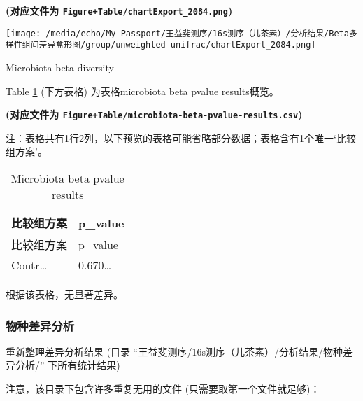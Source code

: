 \documentclass[
]{article}
\begin{document}
\textbf{(对应文件为 \texttt{Figure+Table/chartExport\_2084.png})}

\def\@captype{figure}
\begin{center}
\texttt{[image: /media/echo/My Passport/王益斐测序/16s测序（儿茶素）/分析结果/Beta多样性组间差异盒形图/group/unweighted-unifrac/chartExport\_2084.png]}
\caption{Microbiota beta diversity}\label{fig:microbiota-beta-diversity}
\end{center}

Table \ref{tab:microbiota-beta-pvalue-results} (下方表格) 为表格microbiota beta pvalue results概览。

\textbf{(对应文件为 \texttt{Figure+Table/microbiota-beta-pvalue-results.csv})}

\begin{center}\begin{tcolorbox}[colback=gray!10, colframe=gray!50, width=0.9\linewidth, arc=1mm, boxrule=0.5pt]注：表格共有1行2列，以下预览的表格可能省略部分数据；表格含有1个唯一`比较组方案'。
\end{tcolorbox}
\end{center}

\begin{longtable}[]{@{}ll@{}}
\caption{\label{tab:microbiota-beta-pvalue-results}Microbiota beta pvalue results}\tabularnewline
\toprule
比较组方案 & p\_value\tabularnewline
\midrule
\endfirsthead
\toprule
比较组方案 & p\_value\tabularnewline
\midrule
\endhead
Contr\ldots{} & 0.670\ldots{}\tabularnewline
\bottomrule
\end{longtable}

根据该表格，无显著差异。

\hypertarget{ux7269ux79cdux5deeux5f02ux5206ux6790}{%
\subsubsection{物种差异分析}\label{ux7269ux79cdux5deeux5f02ux5206ux6790}}

重新整理差异分析结果 (目录 ``王益斐测序/16s测序（儿茶素）/分析结果/物种差异分析/'' 下所有统计结果)

注意，该目录下包含许多重复无用的文件 (只需要取第一个文件就足够)：
\end{document}
